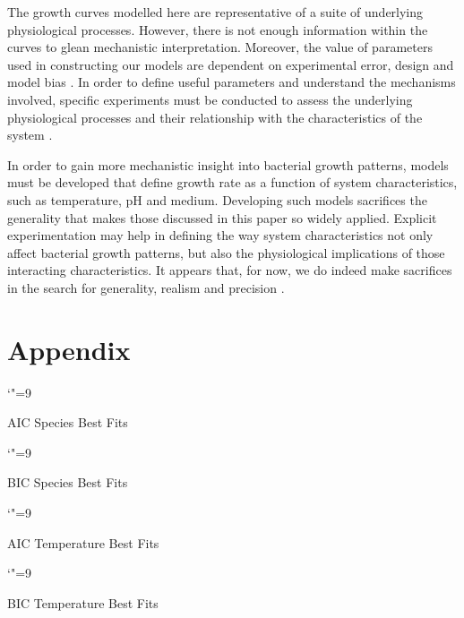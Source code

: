 \documentclass[titlepage]{article}
\begin{document}
\indent The growth curves modelled here are representative of a suite of underlying physiological processes. However, there is not enough information within the curves to glean mechanistic interpretation. Moreover, the value of parameters used in constructing our models are dependent on experimental error, design and model bias \cite{grijspeerdt1999estimating}. In order to define useful parameters and understand the mechanisms involved, specific experiments must be conducted to assess the underlying physiological processes and their relationship with the characteristics of the system \cite{peleg2011microbial}. \

\indent In order to gain more mechanistic insight into bacterial growth patterns, models must be developed that define growth rate as a function of system characteristics, such as temperature, pH and medium. Developing such models sacrifices the generality that makes those discussed in this paper so widely applied. Explicit experimentation may help in defining the way system characteristics not only affect bacterial growth patterns, but also the physiological implications of those interacting characteristics. It appears that, for now, we do indeed make sacrifices in the search for generality, realism and precision \cite{levins1966strategy}.\






\section{Appendix}

\begin{table}[!htbp]
\catcode`"=9
\centering
\caption{AIC Species Best Fits}
\end{table}


\begin{table}[!htbp]
\catcode`"=9
\centering
\caption{BIC Species Best Fits}
\end{table}


\begin{table}[!htbp]
\catcode`"=9
\centering
\caption{AIC Temperature Best Fits}
\end{table}


\begin{table}[!htbp]
\catcode`"=9
\centering
\caption{BIC Temperature Best Fits}
\end{table}
\end{document}
